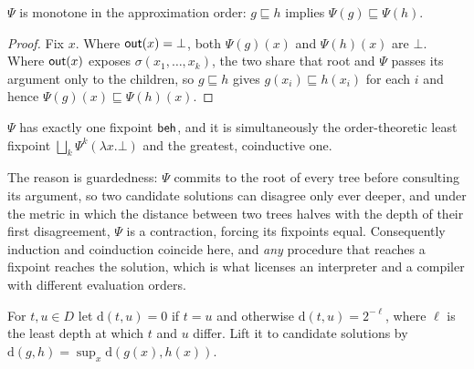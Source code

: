 \begin{lemma}\label{lem:mono-coalgebra}
  $\Psi$ is monotone in the approximation order: $g \sqsubseteq h$ implies $\Psi(g) \sqsubseteq \Psi(h)$.
\end{lemma}
\begin{proof}
  Fix $x$. Where $\mathsf{out}(x) = \bot$, both $\Psi(g)(x)$ and $\Psi(h)(x)$ are $\bot$. Where $\mathsf{out}(x)$ exposes $\sigma(x_1, \dots, x_k)$, the two share that root and $\Psi$ passes its argument only to the children, so $g \sqsubseteq h$ gives $g(x_i) \sqsubseteq h(x_i)$ for each $i$ and hence $\Psi(g)(x) \sqsubseteq \Psi(h)(x)$.
\end{proof}

\begin{theorem}\label{thm:unique-coalgebra}
  $\Psi$ has exactly one fixpoint $\mathsf{beh}$, and it is simultaneously the order-theoretic least fixpoint $\bigsqcup_k \Psi^k(\lambda x.\bot)$ and the greatest, coinductive one.
\end{theorem}

\noindent The reason is guardedness: $\Psi$ commits to the root of every tree before consulting its argument, so two candidate solutions can disagree only ever deeper, and under the metric in which the distance between two trees halves with the depth of their first disagreement, $\Psi$
is a contraction, forcing its fixpoints equal. Consequently induction and coinduction coincide here, and \emph{any}
procedure that reaches a fixpoint reaches the solution, which is what licenses an interpreter and a compiler with different evaluation orders.

\begin{definition}\label{def:metric}
  For $t, u \in D$ let $\mathrm{d}(t, u) = 0$ if $t = u$ and otherwise $\mathrm{d}(t, u) = 2^{-\ell}$, where $\ell$ is the least depth at which $t$ and $u$ differ. Lift it to candidate solutions by $\mathrm{d}(g, h) = \sup_x \mathrm{d}(g(x), h(x))$.
\end{definition}

